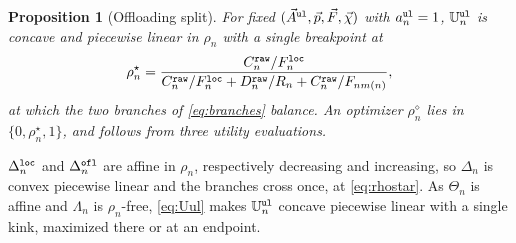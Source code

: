 \documentclass[journal]{IEEEtran}
\newtheorem{proposition}{Proposition}
\begin{document}
\begin{proposition}[Offloading split]\label{prop:rho}
For fixed $(\vec{A}^{\tt ul},\vec{p},\vec{F},\vec{\chi})$ with $a_n^{\tt ul}=1$, $\mathbb{U}_n^{\tt ul}$ is concave and piecewise linear in $\rho_n$ with a single breakpoint at
\begin{equation}
\rho_n^\star
=\frac{C_n^{\tt raw}/F_n^{\tt loc}}
{C_n^{\tt raw}/F_n^{\tt loc}+D_n^{\tt raw}/R_n+C_n^{\tt raw}/F_{n m(n)}},
\label{eq:rhostar}
\end{equation}
at which the two branches of \eqref{eq:branches} balance. 
{An optimizer $\rho_n^\diamond$ lies in $\{0,\rho_n^\star,1\}$, and follows from three utility evaluations.}
\end{proposition}
\begin{IEEEproof}
$\Delta_n^{\tt loc}$ and $\Delta_n^{\tt ofl}$ are affine in $\rho_n$, respectively decreasing and increasing, so $\Delta_n$ is convex piecewise linear and the branches cross once, at \eqref{eq:rhostar}. As $\Theta_n$ is affine and $\Lambda_n$ is $\rho_n$-free, \eqref{eq:Uul} makes $\mathbb{U}_n^{\tt ul}$ concave piecewise linear with a single kink, maximized there or at an endpoint.
\end{IEEEproof}
\end{document}
